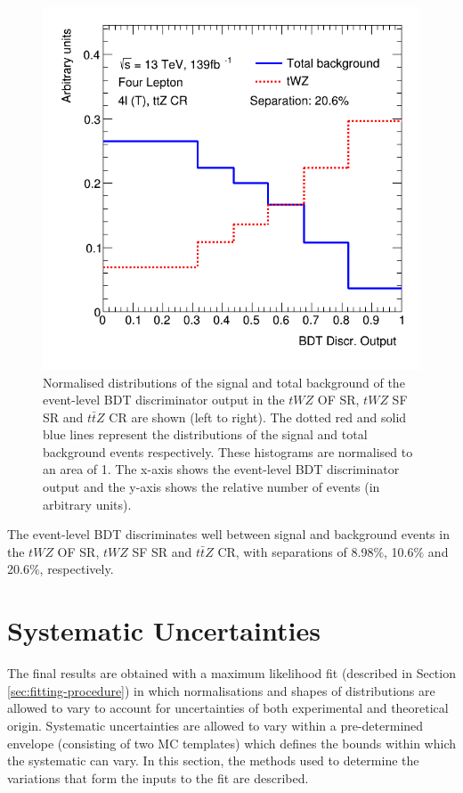 \begin{figure}[h!]
	\includegraphics[scale=0.27]{figures/lep4_ttZ_4T.png}
	\centering
	\caption{Normalised distributions of the signal and total background of the event-level BDT discriminator output in the $tWZ$ OF SR, $tWZ$ SF SR and $t\bar{t}Z$ CR are shown (left to right). The dotted red and solid blue lines represent the distributions of the signal and total background events respectively. These histograms are normalised to an area of 1. The x-axis shows the event-level BDT discriminator output and the y-axis shows the relative number of events (in arbitrary units).}
	\label{fig:2vsm-normdists}
\end{figure}

The event-level BDT discriminates well between signal and background events in the $tWZ$ OF SR, $tWZ$ SF SR and $t\bar{t}Z$ CR, with separations of 8.98$\%$, 10.6$\%$ and 20.6$\%$, respectively.


\section{Systematic Uncertainties}
\label{sec:systematics}
The final results are obtained with a maximum likelihood fit (described in Section \ref{sec:fitting-procedure}) in which normalisations and shapes of distributions are allowed to vary to account for uncertainties of both experimental and theoretical origin. Systematic uncertainties are allowed to vary within a pre-determined envelope (consisting of two MC templates) which defines the bounds within which the systematic can vary. In this section, the methods used to determine the variations that form the inputs to the fit are described.

